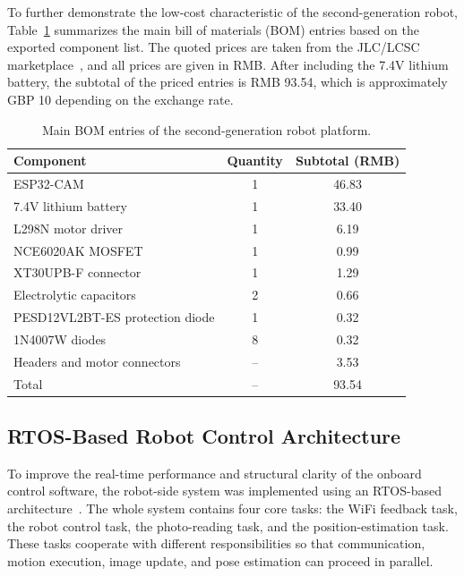 \documentclass[12pt]{interim_report}
\begin{document}
To further demonstrate the low-cost characteristic of the second-generation robot, Table~\ref{tab:robot-bom} summarizes the main bill of materials (BOM) entries based on the exported component list. The quoted prices are taken from the JLC/LCSC marketplace~\cite{lcsc_marketplace}, and all prices are given in RMB. After including the 7.4V lithium battery, the subtotal of the priced entries is RMB 93.54, which is approximately GBP 10 depending on the exchange rate.

\begin{table}[H]
\caption{Main BOM entries of the second-generation robot platform.}
\label{tab:robot-bom}
\centering
\footnotesize
\begin{tabular}{|l|c|c|}
\hline
Component & Quantity & Subtotal (RMB) \\
\hline
ESP32-CAM & 1 & 46.83 \\
7.4V lithium battery & 1 & 33.40 \\
L298N motor driver & 1 & 6.19 \\
NCE6020AK MOSFET & 1 & 0.99 \\
XT30UPB-F connector & 1 & 1.29 \\
Electrolytic capacitors & 2 & 0.66 \\
PESD12VL2BT-ES protection diode & 1 & 0.32 \\
1N4007W diodes & 8 & 0.32 \\
Headers and motor connectors & -- & 3.53 \\
\hline
Total & -- & 93.54 \\
\hline
\end{tabular}
\end{table}

\subsection{RTOS-Based Robot Control Architecture}
\label{subsec:rtos-robot-control-zhuyu-dong}

To improve the real-time performance and structural clarity of the onboard control software, the robot-side system was implemented using an RTOS-based architecture~\cite{freertos_ref_manual}. The whole system contains four core tasks: the WiFi feedback task, the robot control task, the photo-reading task, and the position-estimation task. These tasks cooperate with different responsibilities so that communication, motion execution, image update, and pose estimation can proceed in parallel.
\end{document}

